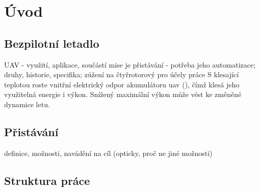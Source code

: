 \chapter{Úvod} \label{chap:introduction}




\section{Bezpilotní letadlo}
UAV - využití, aplikace, součástí mise je přistávání - potřeba jeho automatizace; druhy, historie, specifika; zúžení na čtyřrotorový pro účely práce
S klesající teplotou roste vnitřní elektrický odpor akumulátoru \acrshort{uav} (\cite{lipo}), čímž klesá jeho využitelná energie i výkon. Snížený maximální výkon může vést ke změněné dynamice letu.
\section{Přistávání}
definice, možnosti, navádění na cíl (opticky, proč ne jiné možnosti)
\section{Struktura práce}